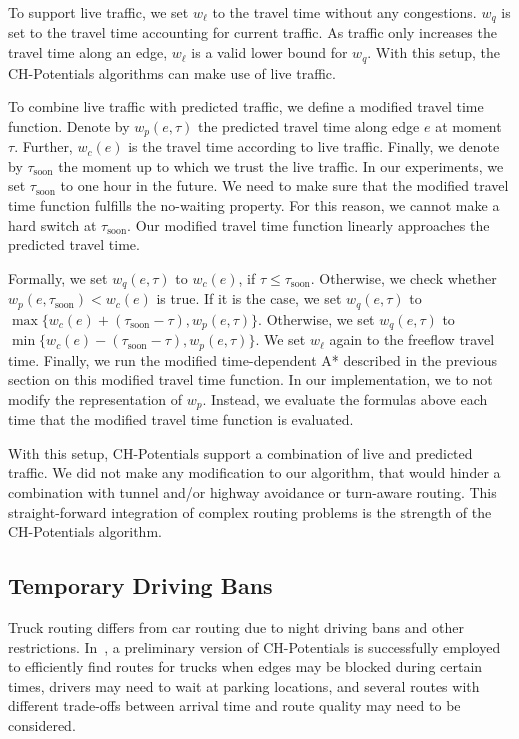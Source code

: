 \documentclass[letterpaper]{article} %
\begin{document}
To support live traffic, we set $w_\ell$ to the travel time without any congestions.
$w_q$ is set to the travel time accounting for current traffic.
As traffic only increases the travel time along an edge, $w_\ell$ is a valid lower bound for $w_q$.
With this setup, the CH-Potentials algorithms can make use of live traffic.

To combine live traffic with predicted traffic, we define a modified travel time function.
Denote by $w_p(e,\tau)$ the predicted travel time along edge $e$ at moment $\tau$.
Further, $w_c(e)$ is the travel time according to live traffic.
Finally, we denote by $\tau_{\mathrm{soon}}$ the moment up to which we trust the live traffic.
In our experiments, we set $\tau_{\mathrm{soon}}$ to one hour in the future.
We need to make sure that the modified travel time function fulfills the no-waiting property.
For this reason, we cannot make a hard switch at $\tau_{\mathrm{soon}}$.
Our modified travel time function linearly approaches the predicted travel time. %

Formally, we set $w_q(e,\tau)$ to $w_c(e)$, if $\tau \leq \tau_{\mathrm{soon}}$.
Otherwise, we check whether $w_p(e,\tau_{\mathrm{soon}}) < w_c(e)$ is true.
If it is the case, we set $w_q(e,\tau)$ to $\max\{w_c(e)+(\tau_{\mathrm{soon}}-\tau), w_p(e,\tau)\}$.
Otherwise, we set $w_q(e,\tau)$ to $\min\{w_c(e)-(\tau_{\mathrm{soon}}-\tau), w_p(e,\tau)\}$.
We set $w_\ell$ again to the freeflow travel time.
Finally, we run the modified time-dependent A* described in the previous section on this modified travel time function.
In our implementation, we to not modify the representation of $w_p$.
Instead, we evaluate the formulas above each time that the modified travel time function is evaluated.

With this setup, CH-Potentials support a combination of live and predicted traffic.
We did not make any modification to our algorithm, that would hinder a combination with tunnel and/or highway avoidance or turn-aware routing.
This straight-forward integration of complex routing problems is the strength of the CH-Potentials algorithm.

\subsection{Temporary Driving Bans}

Truck routing differs from car routing due to night driving bans and other restrictions.
In~\cite{kswz-erptd-20}, a preliminary version of CH-Potentials is successfully employed to efficiently find routes for trucks when edges may be blocked during certain times, drivers may need to wait at parking locations, and several routes with different trade-offs between arrival time and route quality may need to be considered.
\end{document}
